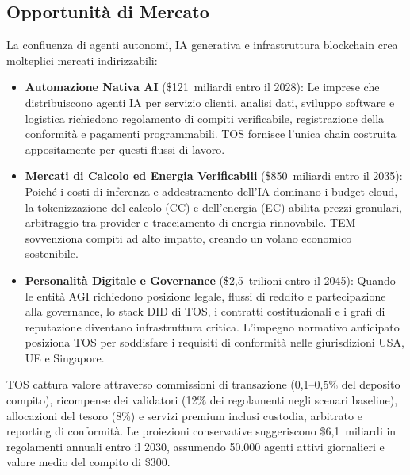\documentclass[11pt]{article}
\begin{document}
\subsection{Opportunità di Mercato}
La confluenza di agenti autonomi, IA generativa e infrastruttura blockchain crea molteplici mercati indirizzabili:
\begin{itemize}[noitemsep]
  \item \textbf{Automazione Nativa AI} (\$121~miliardi entro il 2028): Le imprese che distribuiscono agenti IA per servizio clienti, analisi dati, sviluppo software e logistica richiedono regolamento di compiti verificabile, registrazione della conformità e pagamenti programmabili. TOS fornisce l'unica chain costruita appositamente per questi flussi di lavoro.
  \item \textbf{Mercati di Calcolo ed Energia Verificabili} (\$850~miliardi entro il 2035): Poiché i costi di inferenza e addestramento dell'IA dominano i budget cloud, la tokenizzazione del calcolo (CC) e dell'energia (EC) abilita prezzi granulari, arbitraggio tra provider e tracciamento di energia rinnovabile. TEM sovvenziona compiti ad alto impatto, creando un volano economico sostenibile.
  \item \textbf{Personalità Digitale e Governance} (\$2,5~trilioni entro il 2045): Quando le entità AGI richiedono posizione legale, flussi di reddito e partecipazione alla governance, lo stack DID di TOS, i contratti costituzionali e i grafi di reputazione diventano infrastruttura critica. L'impegno normativo anticipato posiziona TOS per soddisfare i requisiti di conformità nelle giurisdizioni USA, UE e Singapore.
\end{itemize}

TOS cattura valore attraverso commissioni di transazione (0,1--0,5\% del deposito compito), ricompense dei validatori (12\% dei regolamenti negli scenari baseline), allocazioni del tesoro (8\%) e servizi premium inclusi custodia, arbitrato e reporting di conformità. Le proiezioni conservative suggeriscono \$6,1~miliardi in regolamenti annuali entro il 2030, assumendo 50.000 agenti attivi giornalieri e valore medio del compito di \$300.
\end{document}
